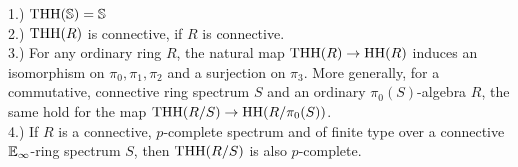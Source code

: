 \begin{lem}  \label{PropertiesTHH}
    1.) $\operatorname{THH}(\mathbb{S})=\mathbb{S}$ \\
    2.) $\operatorname{THH}(R)$ is connective, if $R$ is connective.\\
    3.) For any ordinary ring $R$, the natural map $\operatorname{THH}(R)\to \operatorname{HH}(R)$ induces an isomorphism on $\pi_0,\pi_1,\pi_2$ and a surjection on $\pi_3$. More generally, for a commutative, connective ring spectrum $S$ and an ordinary $\pi_0(S)$-algebra $R$, the same hold for the map $\operatorname{THH}(R/S)\to \operatorname{HH}(R/\pi_0(S))$. \\
    4.) If $R$ is a connective, $p$-complete spectrum and of finite type %
    over a connective $\mathbb{E}_\infty$-ring spectrum $S$, then $\operatorname{THH}(R/S)$ is also $p$-complete.\\   
\end{lem}

